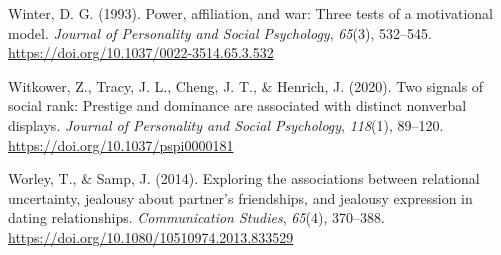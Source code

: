 \documentclass[
  english,
  a4paper]{apa7}
\newlength{\cslhangindent}
\newlength{\cslentryspacingunit} %
\newenvironment{CSLReferences}[2] %
 {%
  \setlength{\parindent}{0pt}
  \ifodd #1
  \let\oldpar\par
  \def\par{\hangindent=\cslhangindent\oldpar}
  \fi
  \setlength{\parskip}{#2\cslentryspacingunit}
 }%
 {}
\begin{document}
\begin{CSLReferences}{1}{0}
\leavevmode{}%
Winter, D. G. (1993). Power, affiliation, and war: Three tests of a motivational model. \emph{Journal of Personality and Social Psychology}, \emph{65}(3), 532--545. \url{https://doi.org/10.1037/0022-3514.65.3.532}

\leavevmode{}%
Witkower, Z., Tracy, J. L., Cheng, J. T., \& Henrich, J. (2020). Two signals of social rank: Prestige and dominance are associated with distinct nonverbal displays. \emph{Journal of Personality and Social Psychology}, \emph{118}(1), 89--120. \url{https://doi.org/10.1037/pspi0000181}

\leavevmode{}%
Worley, T., \& Samp, J. (2014). Exploring the associations between relational uncertainty, jealousy about partner's friendships, and jealousy expression in dating relationships. \emph{Communication Studies}, \emph{65}(4), 370--388. \url{https://doi.org/10.1080/10510974.2013.833529}

\end{CSLReferences}

\endgroup

\newpage
\end{document}
